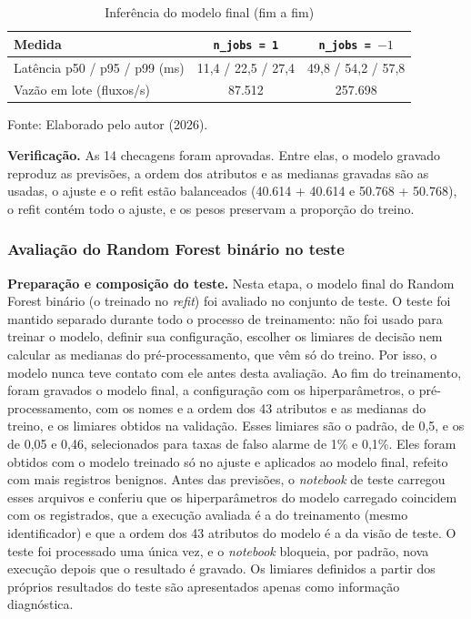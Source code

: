 \documentclass[
    12pt,                %
    openright,           %
    oneside,             %
    a4paper,             %
    english,             %
    brazil               %
]{abntex2}
\begin{document}
\begin{table}
\centering
\caption{Inferência do modelo final (fim a fim)}
\label{tab:inferencia-modelo-final}
\begin{tabular}{lcc}
\hline
Medida & \texttt{n\_jobs = 1} & \texttt{n\_jobs = $-1$} \\
\hline
Latência p50 / p95 / p99 (ms) & 11,4 / 22,5 / 27,4 & 49,8 / 54,2 / 57,8 \\
Vazão em lote (fluxos/s) & 87.512 & 257.698 \\
\hline
\end{tabular}
\par\smallskip
Fonte: Elaborado pelo autor (2026).
\end{table}

\textbf{Verificação.} As 14 checagens foram aprovadas. Entre elas, o modelo gravado reproduz as previsões, a ordem dos atributos e as medianas gravadas são as usadas, o ajuste e o refit estão balanceados (40.614 + 40.614 e 50.768 + 50.768), o refit contém todo o ajuste, e os pesos preservam a proporção do treino.

\subsubsection{Avaliação do Random Forest binário no teste}
\label{sec:rf-bin-teste}

\textbf{Preparação e composição do teste.} Nesta etapa, o modelo final do Random Forest binário (o treinado no \textit{refit}) foi avaliado no conjunto de teste. O teste foi mantido separado durante todo o processo de treinamento: não foi usado para treinar o modelo, definir sua configuração, escolher os limiares de decisão nem calcular as medianas do pré-processamento, que vêm só do treino. Por isso, o modelo nunca teve contato com ele antes desta avaliação. Ao fim do treinamento, foram gravados o modelo final, a configuração com os hiperparâmetros, o pré-processamento, com os nomes e a ordem dos 43 atributos e as medianas do treino, e os limiares obtidos na validação. Esses limiares são o padrão, de 0,5, e os de 0,05 e 0,46, selecionados para taxas de falso alarme de 1\% e 0,1\%. Eles foram obtidos com o modelo treinado só no ajuste e aplicados ao modelo final, refeito com mais registros benignos. Antes das previsões, o \textit{notebook} de teste carregou esses arquivos e conferiu que os hiperparâmetros do modelo carregado coincidem com os registrados, que a execução avaliada é a do treinamento (mesmo identificador) e que a ordem dos 43 atributos do modelo é a da visão de teste. O teste foi processado uma única vez, e o \textit{notebook} bloqueia, por padrão, nova execução depois que o resultado é gravado. Os limiares definidos a partir dos próprios resultados do teste são apresentados apenas como informação diagnóstica.
\end{document}
